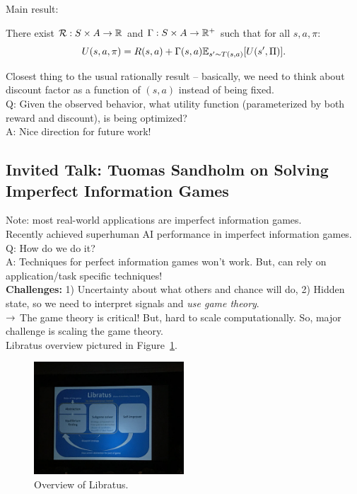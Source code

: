 Main result:
\begin{theorem}
There exist $\mathcal{R} : S \times A \rightarrow \mathbb{R}$ and $\Gamma: S \times A \rightarrow \mathbb{R}^+$ such that for all $s,a,\pi$:
\begin{equation}
    U(s,a,\pi) = R(s,a) + \Gamma(s,a) \mathbb{E}_{s'\sim T(s,a)}[U(s', \Pi)].
\end{equation}
\end{theorem}
Closest thing to the usual rationally result -- basically, we need to think about discount factor as a function of $(s,a)$ instead of being fixed. \\

Q: Given the observed behavior, what utility function (parameterized by both reward and discount), is being optimized? \\

A: Nice direction for future work!

\spacerule

\subsection{Invited Talk: Tuomas Sandholm on Solving Imperfect Information Games}

Note: most real-world applications are imperfect information games. \\

Recently achieved superhuman AI performance in imperfect information games. \\

Q: How do we do it? \\

A: Techniques for perfect information games won't work. But, can rely on application/task specific techniques! \\

{\bf Challenges:} 1) Uncertainty about what others and chance will do, 2) Hidden state, so we need to interpret signals and {\it use game theory}. \\

$\rightarrow$ The game theory is critical! But, hard to scale computationally. So, major challenge is scaling the game theory. \\

Libratus overview pictured in Figure~\ref{fig:libratus}. \\

\begin{figure}[h!]
    \centering
    \includegraphics[width=0.5\textwidth]{images/libratus.JPG}
    \caption{Overview of Libratus.}
    \label{fig:libratus}
\end{figure}

